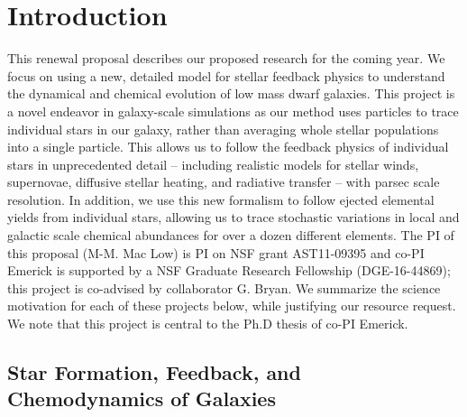 \documentclass[11pt]{article}
\begin{document}
\maketitle

\section{Introduction}
This renewal proposal describes our proposed research for the coming year. We focus on using a new, detailed model for stellar feedback physics to understand the dynamical and chemical evolution of low mass dwarf galaxies. This project is a novel endeavor in galaxy-scale simulations as our method uses particles to trace individual stars in our galaxy, rather than averaging whole stellar populations into a single particle. This allows us to follow the feedback physics of individual stars in unprecedented detail -- including realistic models for stellar winds, supernovae, diffusive stellar heating, and radiative transfer -- with parsec scale resolution. In addition, we use this new formalism to follow ejected elemental yields from individual stars, allowing us to trace stochastic variations in local and galactic scale chemical abundances for over a dozen different elements. The PI of this proposal (M-M. Mac Low) is PI on NSF grant AST11-09395 and co-PI Emerick is supported by a NSF Graduate Research Fellowship (DGE-16-44869); this project is co-advised by collaborator G. Bryan. We summarize the science motivation for each of these projects below, while justifying our resource request. We note that this project is central to the Ph.D thesis of co-PI Emerick.

\subsection{Star Formation, Feedback, and Chemodynamics of Galaxies}
\end{document}
